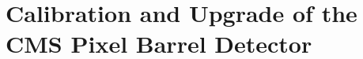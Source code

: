\documentclass[a4paper, 11pt, twoside, openany]{ThesisStyle}
\begin{document}
			

	

	
	
	

	
	
\part{Calibration and Upgrade of the CMS Pixel Barrel Detector}

	
	
	

	
					
\end{document}
